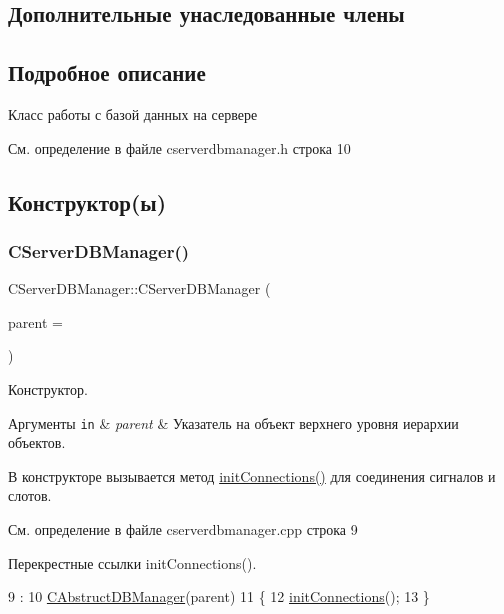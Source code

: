 \subsection*{Дополнительные унаследованные члены}


\subsection{Подробное описание}
Класс работы с базой данных на сервере 

См. определение в файле cserverdbmanager.\+h строка 10



\subsection{Конструктор(ы)}
\hypertarget{class_c_server_d_b_manager_af2bf11fcced1aad0ccd34a3d16c45a03}{}\label{class_c_server_d_b_manager_af2bf11fcced1aad0ccd34a3d16c45a03} 
\subsubsection{\texorpdfstring{C\+Server\+D\+B\+Manager()}{CServerDBManager()}}
{\footnotesize\ttfamily C\+Server\+D\+B\+Manager\+::\+C\+Server\+D\+B\+Manager (\begin{DoxyParamCaption}\item[{Q\+Object $\ast$}]{parent = {} }\end{DoxyParamCaption})}



Конструктор. 


\begin{DoxyParams}[1]{Аргументы}
\mbox{\tt in}  & {\em parent} & Указатель на объект верхнего уровня иерархии объектов.\\
\hline
\end{DoxyParams}
В конструкторе вызывается метод \hyperlink{class_c_server_d_b_manager_a6dcd2f88c0845cc79a47bac2ab9e9235}{init\+Connections()} для соединения сигналов и слотов. 

См. определение в файле cserverdbmanager.\+cpp строка 9



Перекрестные ссылки init\+Connections().


\begin{DoxyCode}
9                                                   :
10     \hyperlink{class_c_abstruct_d_b_manager_a53c2018cfa7a1a24bacd747967509bd7}{CAbstructDBManager}(parent)
11 \{
12     \hyperlink{class_c_server_d_b_manager_a6dcd2f88c0845cc79a47bac2ab9e9235}{initConnections}();
13 \}
\end{DoxyCode}
\hypertarget{class_c_server_d_b_manager_a78afc3d1890662a9bcbb3d184ac71141}{}\label{class_c_server_d_b_manager_a78afc3d1890662a9bcbb3d184ac71141} 
